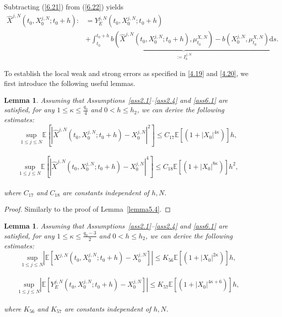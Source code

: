 \documentclass[12pt]{article}
\numberwithin{equation}{section}
\newtheorem{lemma}[assumption]{Lemma}
\begin{document}
Subtracting (\ref{6.21}) from (\ref{6.22}) yields
\begin{equation}\tag{5.125}\label{6.23}
\begin{aligned}
   \hat{X}^{j,N}\left( t_0,X^{j,N}_0;t_0+h \right) :&=Y_{E}^{j,N}\left( t_0,X^{j,N}_0;t_0+h \right)\\
&+\underbrace{\int_{t_0}^{{t_0}+h}{b\left( \hat{X}^{j,N}\left( t_0,X^{j,N}_0;t_0+h \right) ,\mu _{t_0}^{X,N} \right) -b\left( X^{j,N}_0,\mu _{t_0}^{X,N} \right)}\mathrm{d}s}_{:=I_{b}^{j,N}}.
\end{aligned}
\end{equation}

To establish the local weak and strong errors as specified in \eqref{4.19} and \eqref{4.20}, we first introduce the following useful lemmas.

\begin{lemma}\label{lemma6.4}
    Assuming that Assumptions~\ref{ass2.1}--\ref{ass2.4} and \ref{ass6.1} are satisfied, for any $1 \leq \kappa \leq \tfrac{q_0}{4}$ and $0 < h \leq h_2$, we can derive the following estimates:
\begin{equation}\tag{5.126}\label{6.24}
\underset{1\leqslant j\leqslant N}{\mathrm{sup}}\mathbb{E} \left[ \left|\hat{X}^{j,N}\left( t_0,X^{j,N}_0;t_0+h \right) -X^{j,N}_0\right|^2 \right] \le C_{17}\mathbb{E} \left[\left( 1+\left|X_0\right|^{4\kappa}\right) \right] h,
\end{equation}\\
\begin{equation}\tag{5.127}\label{6.25}
\underset{1\leqslant j\leqslant N}{\mathrm{sup}}\mathbb{E} \left[ \left|\hat{X}^{j,N}\left( t_0,X^{j,N}_0;t_0+h \right) -X^{j,N}_0\right|^4 \right] \le C_{18}\mathbb{E} \left[\left( 1+\left|X_0\right|^{8\kappa}\right) \right] h^{2},
\end{equation}\\
where $C_{17}$ and $C_{18}$ are constants independent of $h,N$.
\end{lemma}
\begin{proof}
   Similarly to the proof of Lemma~\ref{lemma5.4}.
\end{proof}
\begin{lemma}\label{lemma6.5}
  Assuming that Assumptions~\ref{ass2.1}--\ref{ass2.4} and \ref{ass6.1} are satisfied, for any $1 \leq \kappa \leq \tfrac{q_0 - 3}{2}$ and $0 < h \leq h_2$, we can derive the following estimates:
\begin{equation}\tag{5.128}\label{6.28}
\underset{1\leqslant j\leqslant N}{\mathrm{sup}}\left| \mathbb{E} \left[ X^{j,N}\left( t_0,X^{j,N}_0;t_0+h \right) -X^{j,N}_0 \right] \right|\le K_{56}\mathbb{E} \left[ \left(1+\left|X_0\right|^{2\kappa}\right) \right] h,
\end{equation}\\
\begin{equation}\tag{5.129}\label{6.29}
\underset{1\leqslant j\leqslant N}{\mathrm{sup}}\left| \mathbb{E} \left[ Y_{E}^{j,N}\left( t_0,X^{j,N}_0;t_0+h \right) -X^{j,N}_0 \right] \right|\le K_{57}\mathbb{E} \left[\left( 1+\left|X_0\right|^{4\kappa +6}\right) \right] h,
\end{equation}\\
where $K_{56}$ and $K_{57}$ are constants independent of $h, N$.
\end{lemma}
\end{document}
